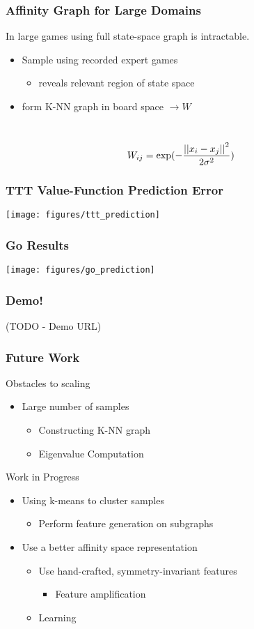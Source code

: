 \begin{frame}
\frametitle{Affinity Graph for Large Domains}
In large games using full state-space graph is intractable.
\begin{itemize}
  \item Sample using recorded expert games
    \begin{itemize}
    \item reveals relevant region of state space
    \end{itemize}
  \item form K-NN graph in board space $\rightarrow W$
\end{itemize} 
\ \\
\begin{equation}
W_{ij} = \exp(-\frac{\left|\left|x_{i}-x_{j}\right|\right|^2}{2 \sigma^2})
\end{equation}
\end{frame}

\begin{frame}
\frametitle{TTT Value-Function Prediction Error}
\texttt{[image: figures/ttt\_prediction]}
\end{frame}

\begin{frame}
\frametitle{Go Results} 
\texttt{[image: figures/go\_prediction]}
\end{frame}

\begin{frame}
\frametitle{Demo!} 
(TODO - Demo URL)
\end{frame}


\begin{frame}
\frametitle{Future Work} 
Obstacles to scaling
    \begin{itemize}
    \item Large number of samples
            \begin{itemize}
            \item Constructing K-NN graph
            \item Eigenvalue Computation
            \end{itemize} 
    \end{itemize} 

Work in Progress
    \begin{itemize}
    \item Using k-means to cluster samples
            \begin{itemize}
            \item Perform feature generation on subgraphs
            \end{itemize}
    \item Use a better affinity space representation
            \begin{itemize}
            \item Use hand-crafted, symmetry-invariant features
                \begin{itemize}
                \item Feature amplification
                \end{itemize}
            \item Learning
            \end{itemize}
    \end{itemize}
\end{frame}
